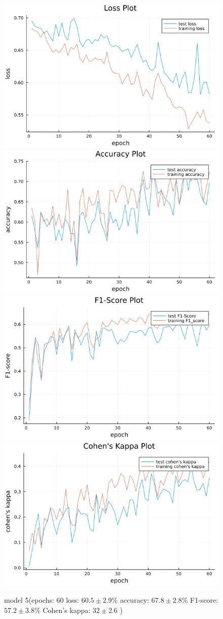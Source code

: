 \documentclass[
a4paper, 
12pt,
grayscalebody, %
abstract=on,
twoside, BCOR10mm, 12pt, DIV13,headinclude, footexclude, final, abstracton, openright
]{ibireprt}
\numberwithin{equation}{chapter}
\numberwithin{table}{chapter}
\numberwithin{figure}{chapter}
\numberwithin{algorithm}{chapter}
\numberwithin{example}{chapter}
\numberwithin{example}{chapter}
\begin{document}
\begin{figure}
	\includegraphics[width=0.4\linewidth]{loss_png_final_2_1.png}\hfill
	\includegraphics[width=0.4\linewidth]{accuracy_png_final_2_1.png}
	\\[\smallskipamount]
	\includegraphics[width=0.4\linewidth]{f1_score_png_final_2_1.png}\hfill
	\includegraphics[width=0.4\linewidth]{cohens_kappa_png_final_2_1.png}
	\caption{model 5(epochs: 60 loss: $60.5\pm2.9\% $ accuracy: $67.8\pm2.8\%$ F1-score: $57.2\pm3.8\%$  Cohen's kappa: $32\pm2.6$ )}
\end{figure}
\end{document}
